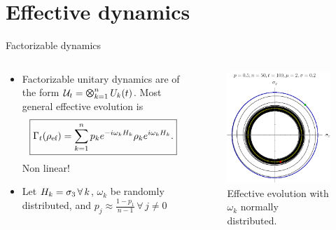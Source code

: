 \section{Effective dynamics}

\begin{frame}{Factorizable dynamics}
    \begin{columns}
        \begin{column}{0.5\textwidth}
            \begin{itemize}
                \item Factorizable unitary dynamics are of the form $\mcU_{t}=\Motimes_{k=1}^{n} U_{k}(t)$.
                Most general effective evolution is
            \begin{equation}
                \boxed{\Gamma_{t}(\rho_{\text{ef}})=\sum_{k=1}^{n}p_{k}e^{-i \omega_{k} H_{k}}\rho_{k}e^{i \omega_{k} H_{k}}.}\nonumber
            \end{equation}
            Non linear!
        \end{itemize}
            \begin{itemize}
                \item Let $H_{k}=\sigma_{3}\,\forall\, k$, $\omega_{k}$ be randomly distributed, and $p_{j}\approx\frac{1-p_{1}}{n-1}\,\forall\,j\neq 0$
            \end{itemize}
        \end{column}
        \begin{column}{0.5\textwidth}
            \begin{figure}[h!]
                \centering
                \includegraphics[width=0.7\linewidth]{figures/local_Z_evol_n=50_p=0.5_normal_std=0.2_mean=2_end=100.png}
                \caption{Effective evolution with $\omega_{k}$ normally distributed. }
                \label{fig:SWAPFactor2D}
              \end{figure}
        \end{column}
    \end{columns}
\end{frame}


